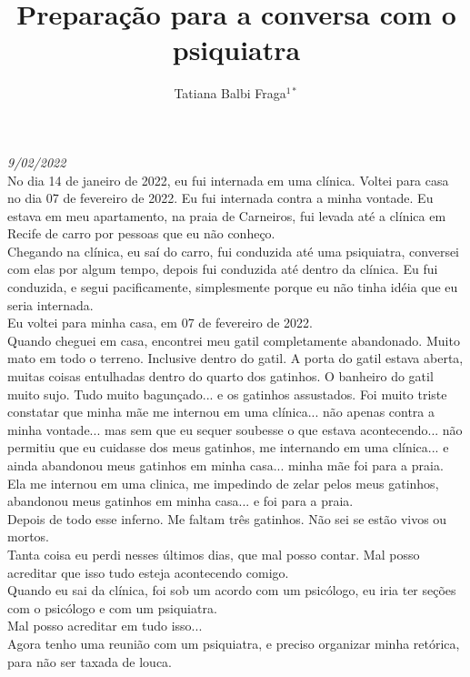 \documentclass{book}
\title{Preparação para a conversa com o psiquiatra}
\author{Tatiana Balbi Fraga$^{1*}$}
\begin{document}
\emph{9/02/2022}  \\

No dia 14 de janeiro de 2022, eu fui internada em uma clínica. Voltei para casa no dia 07 de fevereiro de 2022. Eu fui internada contra a minha vontade. Eu estava em meu apartamento, na praia de Carneiros, fui levada até a clínica em Recife de carro por pessoas que eu não conheço. \\

Chegando na clínica, eu saí do carro, fui conduzida até uma psiquiatra, conversei com elas por algum tempo, depois fui conduzida até dentro da clínica. Eu fui conduzida, e segui pacificamente, simplesmente porque eu não tinha idéia que eu seria internada. \\

Eu voltei para minha casa, em 07 de fevereiro de 2022. \\

Quando cheguei em casa, encontrei meu gatil completamente abandonado. Muito mato em todo o terreno. Inclusive dentro do gatil. A porta do gatil estava aberta, muitas coisas entulhadas dentro do quarto dos gatinhos. O banheiro do gatil muito sujo. Tudo muito bagunçado... e os gatinhos assustados. Foi muito triste constatar que minha mãe me internou em uma clínica... não apenas contra a minha vontade... mas sem que eu sequer soubesse o que estava acontecendo... não permitiu que eu cuidasse dos meus gatinhos, me internando em uma clínica... e ainda abandonou meus gatinhos em minha casa... minha mãe foi para a praia. \\

Ela me internou em uma clinica, me impedindo de zelar pelos meus gatinhos, abandonou meus gatinhos em minha casa... e foi para a praia.\\

Depois de todo esse inferno. Me faltam três gatinhos. Não sei se estão vivos ou mortos. \\

Tanta coisa eu perdi nesses últimos dias, que mal posso contar. Mal posso acreditar que isso tudo esteja acontecendo comigo. \\

Quando eu sai da clínica, foi sob um acordo com um psicólogo, eu iria ter seções com o psicólogo e com um psiquiatra.\\

Mal posso acreditar em tudo isso... \\

Agora tenho uma reunião com um psiquiatra, e preciso organizar minha retórica, para não ser taxada de louca. \\
\end{document}
